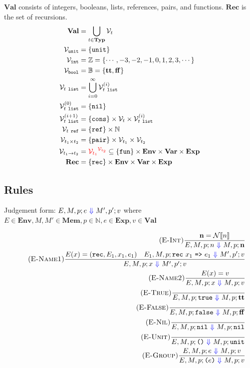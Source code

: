 \documentclass{article}
\newcommand{\btt}{\mathbf{tt}}
\newcommand{\bff}{\mathbf{ff}}
\newcommand{\To}{\ \textcolor{blue}{\Downarrow}\ }
\begin{document}
$\mathbf{Val}$ consists of integers, booleans, lists, references, pairs, and functions.  $\mathbf{Rec}$ is the set of recursions.
\begin{align*}
  \mathbf{Val} &= \bigcup_{t\in\mathbf{Typ}}\mathcal{V}_t \\
  \mathcal{V}_\texttt{unit} &= \{ \texttt{unit} \} \\
  \mathcal{V}_\texttt{int} &= \mathbb{Z} = \{\cdots,-3,-2,-1,0,1,2,3,\cdots\}\\
  \mathcal{V}_\texttt{bool} &= \mathbb{B} = \{\btt,\bff\} \\
  \mathcal{V}_{t\ \texttt{list}} &= \bigcup_{i=0}^{\infty}\mathcal{V}_{t\ \texttt{list}}^{(i)} \\
  \mathcal{V}_{t\ \texttt{list}}^{(0)} &= \{ \texttt{nil} \} \\
  \mathcal{V}_{t\ \texttt{list}}^{(i+1)} &= \{\texttt{cons}\}\times\mathcal{V}_t\times\mathcal{V}_{t\ \texttt{list}}^{(i)} \\
  \mathcal{V}_{t\ \texttt{ref}} &= \{\texttt{ref}\}\times\mathbb{N} \\
  \mathcal{V}_{t_1\times t_2} &= \{\texttt{pair}\}\times\mathcal{V}_{t_1}\times\mathcal{V}_{t_2} \\
  \mathcal{V}_{t_1\rightarrow t_2} &= \textcolor{red}{{\mathcal{V}_{t_1}}^{\mathcal{V}_{t_2}}} \subseteq \{\texttt{fun}\}\times\mathbf{Env}\times\mathbf{Var}\times\mathbf{Exp} \\
  \mathbf{Rec} &= \{\texttt{rec}\}\times\mathbf{Env}\times\mathbf{Var}\times\mathbf{Exp}
\end{align*}

\subsection{Rules}

Judgement form: $E,M,p;e\To M',p';v$ where $E\in\mathbf{Env}, M,M'\in\mathbf{Mem}, p\in\mathbb{N}, e\in\mathbf{Exp}, v\in\mathbf{Val}$

\begin{align*}
\tag{\sc E-Int}
\frac{\mathbf{n}=\mathcal{N}\llbracket n\rrbracket}
{E,M,p;n\To M,p;\mathbf{n}}
\\
\tag{\sc E-Name1}
\frac{E(x)=(\texttt{rec},E_1,x_1,e_1) \quad E_1,M,p;\texttt{rec}\ x_1\ \texttt{=>}\ e_1\To M',p';v}
{E,M,p;x\To M',p';v}
\\
\tag{\sc E-Name2}
\frac{E(x)=v}
{E,M,p;x\To M,p;v}
\\
\tag{\sc E-True}
\frac{}
{E,M,p;\texttt{true}\To M,p;\btt}
\\
\tag{\sc E-False}
\frac{}
{E,M,p;\texttt{false}\To M,p;\bff}
\\
\tag{\sc E-Nil}
\frac{}
{E,M,p;\texttt{nil}\To M,p;\texttt{nil}}
\\
\tag{\sc E-Unit}
\frac{}
{E,M,p;\texttt{()}\To M,p;\texttt{unit}}
\\
\tag{\sc E-Group}
\frac{E,M,p;e\To M,p;v}
{E,M,p;\texttt{(}e\texttt{)}\To M,p;v}
\end{align*}
\end{document}
